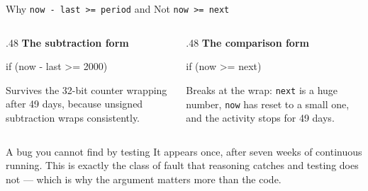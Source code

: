 \documentclass[9pt,aspectratio=169,xcolor=table]{beamer}
\begin{document}
\begin{frame}{Why \texttt{now - last >= period} and Not \texttt{now >= next}}
    \begin{columns}[T]
    \begin{column}{.48\textwidth}
        \textbf{The subtraction form}

        \vspace{1mm}
        {\ttfamily\scriptsize if (now - last >= 2000)}

        \vspace{2mm}
        {\small Survives the 32-bit counter \alert{wrapping} after 49 days,
        because unsigned subtraction wraps consistently.}
    \end{column}
    \begin{column}{.48\textwidth}
        \textbf{The comparison form}

        \vspace{1mm}
        {\ttfamily\scriptsize if (now >= next)}

        \vspace{2mm}
        {\small \alert{Breaks} at the wrap: \texttt{next} is a huge number,
        \texttt{now} has reset to a small one, and the activity stops for
        49 days.}
    \end{column}
    \end{columns}

    \vspace{3mm}
    \begin{block}{A bug you cannot find by testing}
        It appears once, after seven weeks of continuous running. This is exactly
        the class of fault that \alert{reasoning} catches and \alert{testing} does
        not --- which is why the argument matters more than the code.
    \end{block}
\end{frame}
\end{document}
